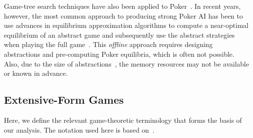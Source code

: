 \documentclass[letterpaper]{article}
\begin{document}



Game-tree search techniques have also been applied to Poker~\cite{Billings04Game}. In recent years, however, 
the most common approach to producing strong Poker AI has been to use advances in equilibrium approximation 
algorithms to compute a near-optimal equilibrium of an abstract game and subsequently use the abstract strategies 
when playing the full game~\cite{Sandholm10The}. This {\it offline} approach requires designing 
abstractions and pre-computing Poker equilibria, which is often not possible. Also, due to the size of 
abstractions~\cite{Johanson13Evaluating}, the memory resources may not be available or known in advance. 

\subsection{Extensive-Form Games}


Here, we define the relevant game-theoretic terminology that forms the basis
of our analysis. The notation used here is based on~\cite{OsbRub94}. 

\end{document}
